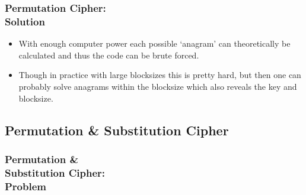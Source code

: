 \documentclass{uva-inf-presentation}
\begin{document}
\begin{frame}
\frametitle{Permutation Cipher:\\ Solution}
\begin{itemize}
    \item With enough computer power each possible ‘anagram’ can theoretically be calculated and thus the code can be
        brute forced.
    \item Though in practice with large blocksizes this is pretty hard, but then one can probably solve anagrams within the
        blocksize which also reveals the key and blocksize.
\end{itemize}
\end{frame}

\subsection{Permutation \& Substitution Cipher}
\frame{\tableofcontents[currentsubsection]}

\begin{frame}
\frametitle{Permutation \&\\ Substitution Cipher:\\ Problem}
\vspace{-30pt}

\end{frame}
\end{document}

